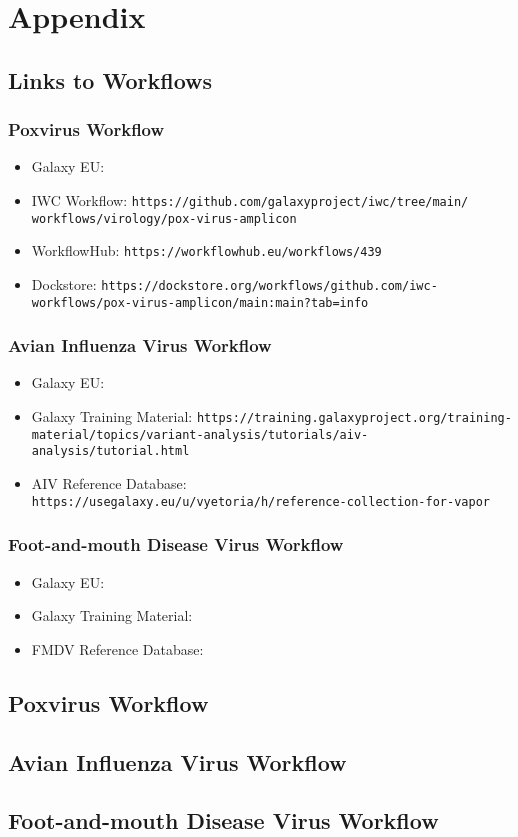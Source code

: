 \chapter*{Appendix}\label{chap:appendix}
\section{Links to Workflows}\label{sec:apx-links}
\subsection*{Poxvirus Workflow}
\begin{itemize}
	\setlength{\itemsep}{-0.4cm}
	\item Galaxy EU: \texttt{}
	\item IWC Workflow: \texttt{https://github.com/galaxyproject/iwc/tree/main/\\workflows/virology/pox-virus-amplicon}
	\item WorkflowHub: \texttt{https://workflowhub.eu/workflows/439}
	\item Dockstore: \texttt{https://dockstore.org/workflows/github.com/iwc-\\workflows/pox-virus-amplicon/main:main?tab=info}
\end{itemize}

\subsection*{Avian Influenza Virus Workflow}\label{sec:apx-aiv-wf}
\begin{itemize}
	\setlength{\itemsep}{-0.4cm}
	\item Galaxy EU: \texttt{}
	\item Galaxy Training Material: \texttt{https://training.galaxyproject.org/training-material/topics/variant-analysis/tutorials/aiv-analysis/tutorial.html}
	\item AIV Reference Database: \texttt{ https://usegalaxy.eu/u/vyetoria/h/reference-collection-for-vapor}
\end{itemize}

\subsection*{Foot-and-mouth Disease Virus Workflow}
\begin{itemize}
	\setlength{\itemsep}{-0.4cm}
	\item Galaxy EU: \texttt{}
	\item Galaxy Training Material: \texttt{}
	\item FMDV Reference Database: \texttt{}
\end{itemize}

\section{Poxvirus Workflow}\label{sec:apx-pox}

\section{Avian Influenza Virus Workflow}\label{sec:apx-aiv}

\section{Foot-and-mouth Disease Virus Workflow}\label{sec:apx-fmdv}
